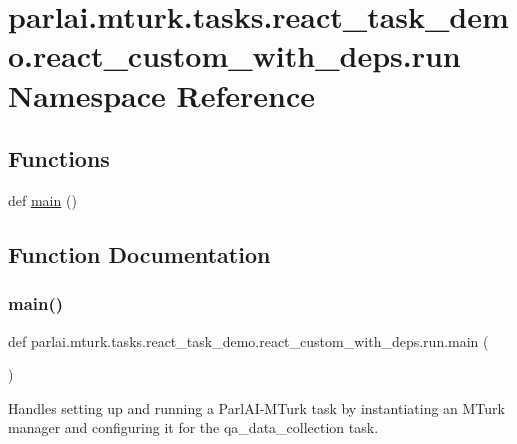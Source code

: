 \hypertarget{namespaceparlai_1_1mturk_1_1tasks_1_1react__task__demo_1_1react__custom__with__deps_1_1run}{}\section{parlai.\+mturk.\+tasks.\+react\+\_\+task\+\_\+demo.\+react\+\_\+custom\+\_\+with\+\_\+deps.\+run Namespace Reference}
\label{namespaceparlai_1_1mturk_1_1tasks_1_1react__task__demo_1_1react__custom__with__deps_1_1run}
\subsection*{Functions}
\begin{DoxyCompactItemize}
\item 
def \hyperlink{namespaceparlai_1_1mturk_1_1tasks_1_1react__task__demo_1_1react__custom__with__deps_1_1run_a50f23070329d468b1499c88037338007}{main} ()
\end{DoxyCompactItemize}


\subsection{Function Documentation}
\mbox{\label{namespaceparlai_1_1mturk_1_1tasks_1_1react__task__demo_1_1react__custom__with__deps_1_1run_a50f23070329d468b1499c88037338007}} 
\subsubsection{\texorpdfstring{main()}{main()}}
{\footnotesize\ttfamily def parlai.\+mturk.\+tasks.\+react\+\_\+task\+\_\+demo.\+react\+\_\+custom\+\_\+with\+\_\+deps.\+run.\+main (\begin{DoxyParamCaption}{ }\end{DoxyParamCaption})}

\begin{DoxyVerb}Handles setting up and running a ParlAI-MTurk task by instantiating an MTurk manager
and configuring it for the qa_data_collection task.
\end{DoxyVerb}
 
